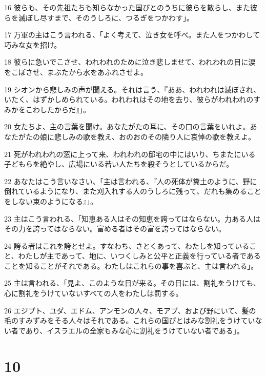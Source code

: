 \par 16 彼らも、その先祖たちも知らなかった国びとのうちに彼らを散らし、また彼らを滅ぼし尽すまで、そのうしろに、つるぎをつかわす」。
\par 17 万軍の主はこう言われる、「よく考えて、泣き女を呼べ。また人をつかわして巧みな女を招け。
\par 18 彼らに急いでこさせ、われわれのために泣き悲しませて、われわれの目に涙をこぼさせ、まぶたから水をあふれさせよ。
\par 19 シオンから悲しみの声が聞える。それは言う、『ああ、われわれは滅ぼされ、いたく、はずかしめられている。われわれはその地を去り、彼らがわれわれのすみかをこわしたからだ』」。
\par 20 女たちよ、主の言葉を聞け。あなたがたの耳に、その口の言葉をいれよ。あなたがたの娘に悲しみの歌を教え、おのおのその隣り人に哀悼の歌を教えよ。
\par 21 死がわれわれの窓に上って来、われわれの邸宅の中にはいり、ちまたにいる子どもらを絶やし、広場にいる若い人たちを殺そうとしているからだ。
\par 22 あなたはこう言いなさい、「主は言われる、『人の死体が糞土のように、野に倒れているようになり、また刈入れする人のうしろに残って、だれも集めることをしない束のようになる』」。
\par 23 主はこう言われる、「知恵ある人はその知恵を誇ってはならない。力ある人はその力を誇ってはならない。富める者はその富を誇ってはならない。
\par 24 誇る者はこれを誇とせよ。すなわち、さとくあって、わたしを知っていること、わたしが主であって、地に、いつくしみと公平と正義を行っている者であることを知ることがそれである。わたしはこれらの事を喜ぶと、主は言われる」。
\par 25 主は言われる、「見よ、このような日が来る。その日には、割礼をうけても、心に割礼をうけていないすべての人をわたしは罰する。
\par 26 エジプト、ユダ、エドム、アンモンの人々、モアブ、および野にいて、髪の毛のすみずみをそる人々はそれである。これらの国びとはみな割礼をうけていない者であり、イスラエルの全家もみな心に割礼をうけていない者である」。

\chapter{10}

